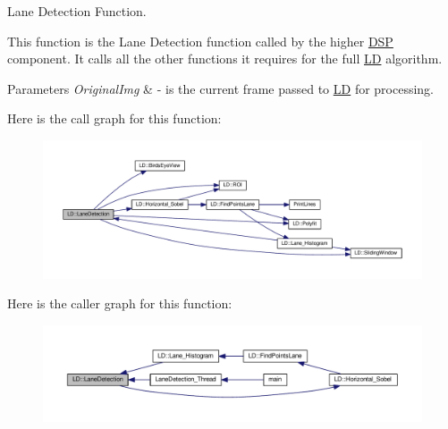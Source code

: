 Lane Detection Function. 

This function is the Lane Detection function called by the higher \hyperlink{namespaceDSP}{D\+SP} component. It calls all the other functions it requires for the full \hyperlink{namespaceLD}{LD} algorithm. 
\begin{DoxyParams}{Parameters}
{\em Original\+Img} & -\/ is the current frame passed to \hyperlink{namespaceLD}{LD} for processing. \\
\hline
\end{DoxyParams}


Here is the call graph for this function\+:\nopagebreak
\begin{figure}[H]
\begin{center}
\leavevmode
\includegraphics[width=350pt]{namespaceLD_ac725c61b114fcf28e0fc6ddf79b22d66_cgraph}
\end{center}
\end{figure}




Here is the caller graph for this function\+:\nopagebreak
\begin{figure}[H]
\begin{center}
\leavevmode
\includegraphics[width=350pt]{namespaceLD_ac725c61b114fcf28e0fc6ddf79b22d66_icgraph}
\end{center}
\end{figure}


